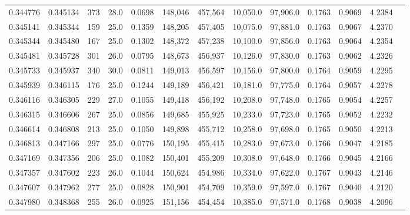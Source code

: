 \begin{tabular}{rrrrrrrrrrrrr}
0.344776 & 0.345134 &   373 & 28.0 &                                     0.0698 & 148,046 & 457,564 &  10,050.0 &  97,906.0 & 0.1763 & 0.9069 & 4.2384 \\
0.345141 & 0.345344 &   159 & 25.0 &                                     0.1359 & 148,205 & 457,405 &  10,075.0 &  97,881.0 & 0.1763 & 0.9067 & 4.2370 \\
0.345344 & 0.345480 &   167 & 25.0 &                                     0.1302 & 148,372 & 457,238 &  10,100.0 &  97,856.0 & 0.1763 & 0.9064 & 4.2354 \\
0.345481 & 0.345728 &   301 & 26.0 &                                     0.0795 & 148,673 & 456,937 &  10,126.0 &  97,830.0 & 0.1763 & 0.9062 & 4.2326 \\
0.345733 & 0.345937 &   340 & 30.0 &                                     0.0811 & 149,013 & 456,597 &  10,156.0 &  97,800.0 & 0.1764 & 0.9059 & 4.2295 \\
0.345939 & 0.346115 &   176 & 25.0 &                                     0.1244 & 149,189 & 456,421 &  10,181.0 &  97,775.0 & 0.1764 & 0.9057 & 4.2278 \\
0.346116 & 0.346305 &   229 & 27.0 &                                     0.1055 & 149,418 & 456,192 &  10,208.0 &  97,748.0 & 0.1765 & 0.9054 & 4.2257 \\
0.346315 & 0.346606 &   267 & 25.0 &                                     0.0856 & 149,685 & 455,925 &  10,233.0 &  97,723.0 & 0.1765 & 0.9052 & 4.2232 \\
0.346614 & 0.346808 &   213 & 25.0 &                                     0.1050 & 149,898 & 455,712 &  10,258.0 &  97,698.0 & 0.1765 & 0.9050 & 4.2213 \\
0.346813 & 0.347166 &   297 & 25.0 &                                     0.0776 & 150,195 & 455,415 &  10,283.0 &  97,673.0 & 0.1766 & 0.9047 & 4.2185 \\
0.347169 & 0.347356 &   206 & 25.0 &                                     0.1082 & 150,401 & 455,209 &  10,308.0 &  97,648.0 & 0.1766 & 0.9045 & 4.2166 \\
0.347357 & 0.347602 &   223 & 26.0 &                                     0.1044 & 150,624 & 454,986 &  10,334.0 &  97,622.0 & 0.1767 & 0.9043 & 4.2146 \\
0.347607 & 0.347962 &   277 & 25.0 &                                     0.0828 & 150,901 & 454,709 &  10,359.0 &  97,597.0 & 0.1767 & 0.9040 & 4.2120 \\
0.347980 & 0.348368 &   255 & 26.0 &                                     0.0925 & 151,156 & 454,454 &  10,385.0 &  97,571.0 & 0.1768 & 0.9038 & 4.2096 \\

\end{tabular}
